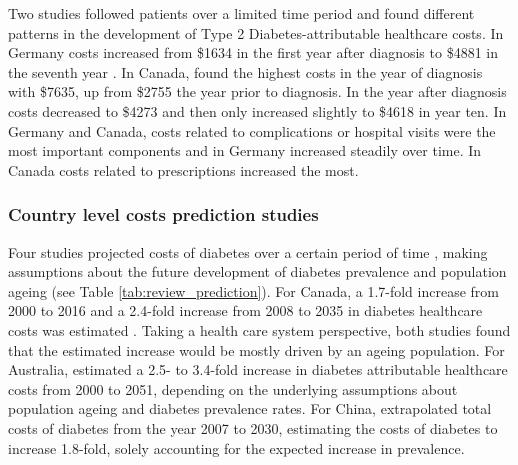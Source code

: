 \documentclass[12pt,english]{article}
\begin{document}
Two studies followed patients over a limited time period and found different patterns in the development of Type 2 Diabetes-attributable healthcare costs. In Germany costs increased from  \$1634 in the first year after diagnosis to \$4881 in the seventh year \parencite{Martin2007b}. In Canada, \textcite{Johnson2006d} found the highest costs in the year of diagnosis with \$7635, up from \$2755 the year prior to diagnosis. In the year after diagnosis costs decreased to \$4273 and then only increased slightly to \$4618 in year ten. In Germany and Canada, costs related to complications or hospital visits were the most important components and in Germany increased steadily over time. In Canada costs related to prescriptions increased the most.

\subsubsection{Country level costs prediction studies}
Four studies projected costs of diabetes over a certain period of time \parencite{Ohinmaa2004,Lau2011a,Davis2006b,Wang2009f}, making assumptions about the future development of diabetes prevalence and population ageing (see Table \ref{tab:review_prediction}). For Canada, a 1.7-fold increase from 2000 to 2016 \parencite{Ohinmaa2004} and a 2.4-fold increase from 2008 to 2035 in diabetes healthcare costs was estimated \parencite{Lau2011a}. Taking a health care system perspective, both studies found that the estimated increase would be mostly driven by an ageing population. For Australia, \textcite{Davis2006b} estimated a 2.5- to 3.4-fold increase in diabetes attributable healthcare costs from 2000 to 2051, depending on the underlying assumptions about population ageing and diabetes prevalence rates. For China, \textcite{Wang2009f} extrapolated total costs of diabetes from the year 2007 to 2030, estimating the costs of diabetes to increase 1.8-fold, solely accounting for the expected increase in prevalence.
\end{document}
